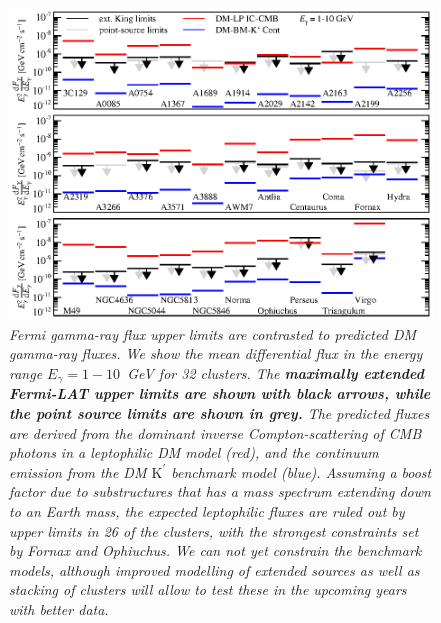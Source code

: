 \documentclass[10pt,aps,pra,reprint,amsmath,amsfonts,amssymb,showpacs,nofootinbib,floatfix]{revtex4-1}
\def\C#1{{\bf #1}}
\newcommand{\Fermi}{{\em Fermi}\xspace}
\newcommand{\rmn}{\mathrm}
\newcommand{\Kp}{\rmn{K}^\prime}
\begin{document}
\begin{figure}
\begin{minipage}{2.0\columnwidth}
  \includegraphics[width=0.99\columnwidth]{figures/Fermi.comp.DM.eps}
  \caption{\it \Fermi gamma-ray flux upper limits are contrasted to 
    predicted DM gamma-ray fluxes. We show the mean differential flux in
    the energy range $E_\gamma=1-10$~GeV for 32 clusters. The
    \C{maximally extended \Fermi-LAT upper limits are shown with black
      arrows, while the point source limits are shown in grey.} The
    predicted fluxes are derived from the dominant inverse
    Compton-scattering of CMB photons in a leptophilic DM model (red),
    and the continuum emission from the DM $\Kp$ benchmark model
    (blue). Assuming a boost factor due to substructures that has a
    mass spectrum extending down to an Earth mass, the expected
    leptophilic fluxes are ruled out by upper limits in 26 of the
    clusters, with the strongest constraints set by Fornax and
    Ophiuchus. We can not yet constrain the benchmark models,
    although improved modelling of extended sources as well as
    stacking of clusters will allow to test these in the upcoming
    years with better data.}
 \label{fig14}
\end{minipage}
\end{figure}
\end{document}
